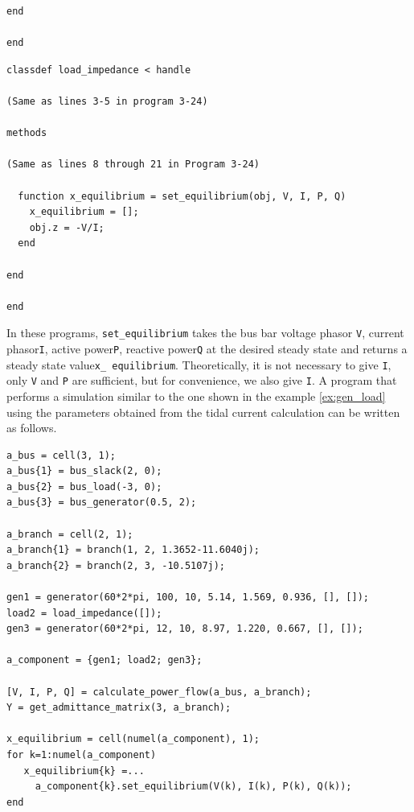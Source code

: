 \documentclass[graybox, envcountchap]{svmult}
\begin{document}
\begin{example}
\begin{PROGRAMA}[count,title={generator.m}]
\begin{verbatim}
end
  
end
\end{verbatim}
\end{PROGRAMA}

\smallskip
\begin{PROGRAMA}[count,title={load\_impedance.m}]\label{program:load2}
\begin{verbatim}
classdef load_impedance < handle
  
(Same as lines 3-5 in program 3-24)

methods
  
(Same as lines 8 through 21 in Program 3-24)

  function x_equilibrium = set_equilibrium(obj, V, I, P, Q)
    x_equilibrium = [];
    obj.z = -V/I;
  end

end

end
\end{verbatim}
\end{PROGRAMA}
In these programs, \verb|set_equilibrium| takes the bus bar voltage phasor \verb|V|, current phasor\verb|I|, active power\verb|P|, reactive power\verb|Q| at the desired steady state and returns a steady state value\verb|x_ equilibrium|.
Theoretically, it is not necessary to give \verb|I|, only \verb|V| and \verb|P| are sufficient, but for convenience, we also give \verb|I|.
A program that performs a simulation similar to the one shown in the example \ref{ex:gen_load} using the parameters obtained from the tidal current calculation can be written as follows.

\smallskip
\begin{PROGRAMA}[count,title={main\_simulation\_3bus\_equilibrium.m}]\label{program:main_equilibrium}
\begin{verbatim}
a_bus = cell(3, 1);
a_bus{1} = bus_slack(2, 0);
a_bus{2} = bus_load(-3, 0);
a_bus{3} = bus_generator(0.5, 2);

a_branch = cell(2, 1);
a_branch{1} = branch(1, 2, 1.3652-11.6040j);
a_branch{2} = branch(2, 3, -10.5107j);

gen1 = generator(60*2*pi, 100, 10, 5.14, 1.569, 0.936, [], []);
load2 = load_impedance([]);
gen3 = generator(60*2*pi, 12, 10, 8.97, 1.220, 0.667, [], []);

a_component = {gen1; load2; gen3};

[V, I, P, Q] = calculate_power_flow(a_bus, a_branch);
Y = get_admittance_matrix(3, a_branch);

x_equilibrium = cell(numel(a_component), 1);
for k=1:numel(a_component)
   x_equilibrium{k} =...
     a_component{k}.set_equilibrium(V(k), I(k), P(k), Q(k)); 
end


\end{verbatim}
\end{PROGRAMA}
\end{example}
\end{document}
